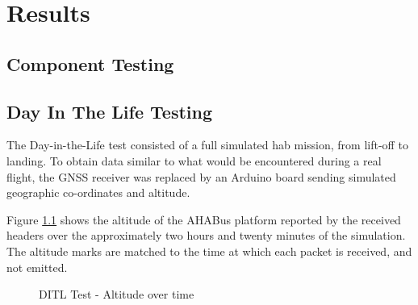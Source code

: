 \chapter{Results}
\label{ch:results}

\section{Component Testing}

\section{Day In The Life Testing}

The Day-in-the-Life test consisted of a full simulated \acrlong{hab} mission,
from lift-off to landing. To obtain data similar to what would be encountered
during a real flight, the GNSS receiver was replaced by an Arduino board 
sending simulated geographic co-ordinates and altitude.

Figure \ref{fig:dit-alt} shows the altitude of the AHABus platform reported by
the received headers over the approximately two hours and twenty minutes of the
simulation. The altitude marks are matched to the time at which each packet
is received, and not emitted.

\begin{figure}[H]
\centering
\caption{DITL Test - Altitude over time}
\label{fig:dit-alt}
\end{figure}

%

